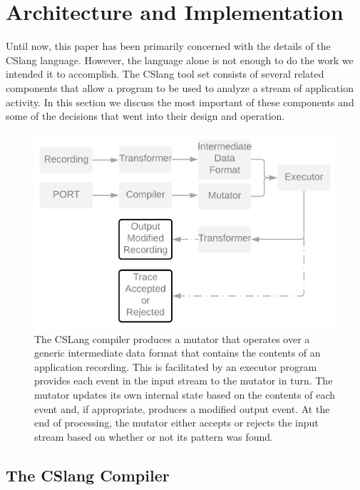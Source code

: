 \section{Architecture and Implementation}

Until now, this paper has been primarily concerned with the details of the
CSlang language.  However, the language alone is not enough to do the work
we intended it to accomplish.  The CSlang tool set
consists of several related
components that allow a program to be used to analyze a stream of
application activity.
In this section we discuss the most important of these components and some
of the decisions that went into their design and operation.

\label{SEC:architecture}

\begin{figure}
  \includegraphics[scale=.19]{images/architecture}
  \caption{The CSLang compiler produces a mutator that operates over a
  generic intermediate data format that contains the contents of an application
  recording.  This is facilitated by an executor program provides each
  event in the input stream to the mutator in turn.  The mutator updates
  its own internal state based on the contents of each event and, if
  appropriate, produces a modified output event.  At the end of processing,
  the mutator either accepts or rejects the input stream based on whether
  or not its pattern was found.}
  \label{fig:architecture}
\end{figure}

\subsection{The CSlang Compiler}

